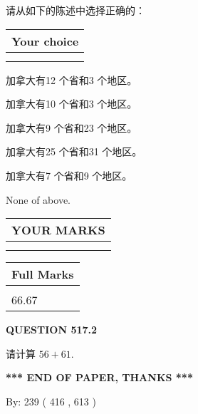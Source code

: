 \documentclass{ctexart}
\begin{document}
  
请从如下的陈述中选择正确的：
  
  
\noindent\hspace{3.0in} \begin{tabular}{|l|}
\hline
Your choice \\
\hline
 \\ 
 \\ 
\hline
\end{tabular}
  
  
 
 
加拿大有12 个省和3 个地区。
 
 
加拿大有10 个省和3 个地区。
 
 
加拿大有9 个省和23 个地区。
 
 
加拿大有25 个省和31 个地区。
 
 
加拿大有7 个省和9 个地区。
 
 
 None of above.
 
 
  
\vspace{0.2in}
  
\noindent\begin{tabular}{|l|}
\hline
 YOUR MARKS  \\
\hline
 \\ 
 \\ 
\hline
\end{tabular}
\hspace{0.05in} \begin{tabular}{|l|}
\hline
 Full Marks  \\
\hline
 \\ 
66.67 \\
\hline
\end{tabular}
{\textbf{\Large{QUESTION
517.2 
}}}
  
  
 
请计算 $ %
56 +  %
61 $.
 

 

 
   
   
 \vspace{0.2in}
 
   
   
   
   
\vspace{1.0in} 
{\textbf{\large{ *** END OF PAPER, THANKS *** }}} 
   
   
\hspace{1.0in} By: 
 239 ( 416 ,  613 )
   
\end{document}

